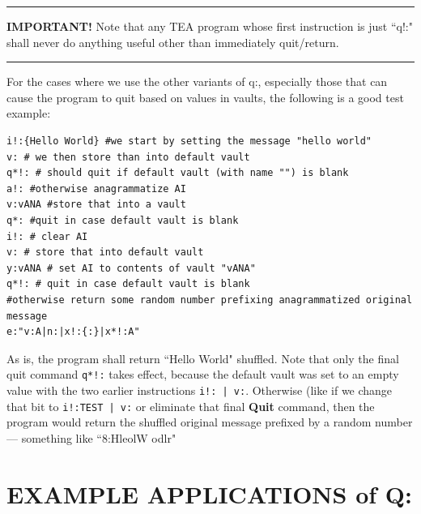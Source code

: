 \documentclass[a4paper, 18pt]{book} %
\begin{document}
{{\vspace{1em}

\noindent\rule{\textwidth}{0.4pt}

\textbf{IMPORTANT!} Note that any TEA program whose first instruction is just ``q!:" shall never do anything useful other than immediately quit/return.

\noindent\rule{\textwidth}{0.4pt}

\vspace{2em}

For the cases where we use the other variants of q:, especially those that can cause the program to quit based on values in vaults, the following is a good test example:


\vspace{1em}

  \begin{tcolorbox}[teaterminalstyle, title=Q: EXAMPLE 3: Using Q With Patterns in Vaults, breakable]
  \begin{lstlisting}[language=TEA,breaklines=true,]
i!:{Hello World} #we start by setting the message "hello world"
v: # we then store than into default vault
q*!: # should quit if default vault (with name "") is blank
a!: #otherwise anagrammatize AI
v:vANA #store that into a vault
q*: #quit in case default vault is blank
i!: # clear AI
v: # store that into default vault
y:vANA # set AI to contents of vault "vANA"
q*!: # quit in case default vault is blank
#otherwise return some random number prefixing anagrammatized original message
e:"v:A|n:|x!:{:}|x*!:A"
   \end{lstlisting}
  \end{tcolorbox}

\vspace{1em}

As is, the program shall return ``Hello World" shuffled. Note that only the final quit command \texttt{q*!:} takes effect, because the default vault was set to an empty value with the two earlier instructions \texttt{i!: | v:}. Otherwise (like if we change that bit to \texttt{i!:TEST | v:} or eliminate that final \textbf{Quit} command, then the program would return the shuffled original message prefixed by a random number --- something like ``8:HleolW odlr"



\section{EXAMPLE APPLICATIONS of Q:}
\label{SECEXAMPQ}

}}
\end{document}
